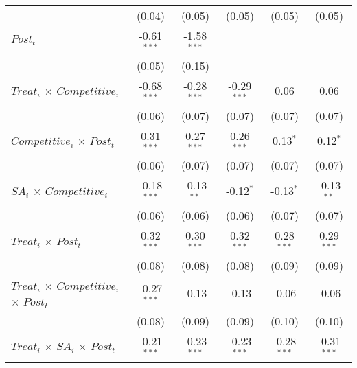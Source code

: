\documentclass[
]{article}
\begin{document}
\begin{table}[htbp]
\begin{tabular}{lccccc}
                                                                              & (0.04)        & (0.05)        & (0.05)        & (0.05)        & (0.05)\\
      $Post_t$                                                                & -0.61$^{***}$ & -1.58$^{***}$ &               &               &   \\
                                                                              & (0.05)        & (0.15)        &               &               &   \\
      $Treat_i$ $\times$ $Competitive_i$                                     & -0.68$^{***}$ & -0.28$^{***}$ & -0.29$^{***}$ & 0.06          & 0.06\\
                                                                              & (0.06)        & (0.07)        & (0.07)        & (0.07)        & (0.07)\\
      $Competitive_i$ $\times$ $Post_t$                                      & 0.31$^{***}$  & 0.27$^{***}$  & 0.26$^{***}$  & 0.13$^{*}$    & 0.12$^{*}$\\
                                                                              & (0.06)        & (0.07)        & (0.07)        & (0.07)        & (0.07)\\
      $SA_i$ $\times$ $Competitive_i$                                        & -0.18$^{***}$ & -0.13$^{**}$  & -0.12$^{*}$   & -0.13$^{*}$   & -0.13$^{**}$\\
                                                                              & (0.06)        & (0.06)        & (0.06)        & (0.07)        & (0.07)\\
      $Treat_i$ $\times$ $Post_t$                                            & 0.32$^{***}$  & 0.30$^{***}$  & 0.32$^{***}$  & 0.28$^{***}$  & 0.29$^{***}$\\
                                                                              & (0.08)        & (0.08)        & (0.08)        & (0.09)        & (0.09)\\
      $Treat_i$ $\times$ $Competitive_i$ $\times$ $Post_t$                  & -0.27$^{***}$ & -0.13         & -0.13         & -0.06         & -0.06\\
                                                                              & (0.08)        & (0.09)        & (0.09)        & (0.10)        & (0.10)\\
      $Treat_i$ $\times$ $SA_i$ $\times$ $Post_t$                           & -0.21$^{***}$ & -0.23$^{***}$ & -0.23$^{***}$ & -0.28$^{***}$ & -0.31$^{***}$\\

\end{tabular}
\end{table}
\end{document}
